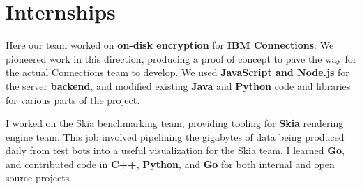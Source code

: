 \documentclass{my_resume}
\begin{document}
\section{Internships}
\begin{flushleft}
Here our team worked on \textbf{on-disk encryption} for \textbf{IBM Connections}.
We pioneered work in this direction, producing a proof of concept to pave the way for the actual Connections team to develop.
We used \textbf{JavaScript and Node.js} for the server \textbf{backend}, and modified existing \textbf{Java} and \textbf{Python} code and libraries for various parts of the project.
\end{flushleft}
\begin{flushleft}
I worked on the Skia benchmarking team, providing tooling for \textbf{Skia} rendering engine team.
This job involved pipelining the gigabytes of data being produced daily from test bots into a useful visualization for the Skia team.
I learned \textbf{Go}, and contributed code in \textbf{C++}, \textbf{Python}, and \textbf{Go} for both internal and open source projects.
\end{flushleft}
\end{document}
